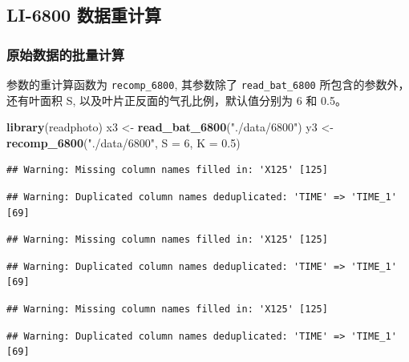 \documentclass[
]{krantz}
\makeatletter
\newenvironment{Shaded}{\begin{snugshade}}{\end{snugshade}}
\newcommand{\DataTypeTok}[1]{\textcolor[rgb]{0.13,0.29,0.53}{#1}}
\newcommand{\DecValTok}[1]{\textcolor[rgb]{0.00,0.00,0.81}{#1}}
\newcommand{\FloatTok}[1]{\textcolor[rgb]{0.00,0.00,0.81}{#1}}
\newcommand{\KeywordTok}[1]{\textcolor[rgb]{0.13,0.29,0.53}{\textbf{#1}}}
\newcommand{\NormalTok}[1]{#1}
\newcommand{\StringTok}[1]{\textcolor[rgb]{0.31,0.60,0.02}{#1}}
\newenvironment{kframe}{%
\medskip{}
\setlength{\fboxsep}{.8em}
 \def\at@end@of@kframe{}%
 \ifinner\ifhmode%
  \def\at@end@of@kframe{\end{minipage}}%
  \begin{minipage}{\columnwidth}%
 \fi\fi%
 \def\FrameCommand##1{\hskip\@totalleftmargin \hskip-\fboxsep
 \colorbox{shadecolor}{##1}\hskip-\fboxsep
     \hskip-\linewidth \hskip-\@totalleftmargin \hskip\columnwidth}%
 \MakeFramed {\advance\hsize-\width
   \@totalleftmargin\z@ \linewidth\hsize
   \@setminipage}}%
 {\par\unskip\endMakeFramed%
 \at@end@of@kframe}
\renewenvironment{Shaded}{\begin{kframe}}{\end{kframe}}
\makeatother
\begin{document}
\hypertarget{recompute6800}{%
\subsection{LI-6800 数据重计算}\label{recompute6800}}

\hypertarget{raw-batch-68}{%
\subsubsection{原始数据的批量计算}\label{raw-batch-68}}

参数的重计算函数为 \texttt{recomp\_6800}, 其参数除了 \texttt{read\_bat\_6800} 所包含的参数外，还有叶面积 S, 以及叶片正反面的气孔比例，默认值分别为 6 和 0.5。

\begin{Shaded}
\begin{Highlighting}[]
\KeywordTok{library}\NormalTok{(readphoto)}
\NormalTok{x3 <-}\StringTok{ }\KeywordTok{read_bat_6800}\NormalTok{(}\StringTok{"./data/6800"}\NormalTok{)}
\NormalTok{y3 <-}\StringTok{ }\KeywordTok{recomp_6800}\NormalTok{(}\StringTok{"./data/6800"}\NormalTok{, }\DataTypeTok{S =} \DecValTok{6}\NormalTok{, }\DataTypeTok{K =} \FloatTok{0.5}\NormalTok{)}
\end{Highlighting}
\end{Shaded}

\begin{verbatim}
## Warning: Missing column names filled in: 'X125' [125]
\end{verbatim}

\begin{verbatim}
## Warning: Duplicated column names deduplicated: 'TIME' => 'TIME_1' [69]
\end{verbatim}

\begin{verbatim}
## Warning: Missing column names filled in: 'X125' [125]
\end{verbatim}

\begin{verbatim}
## Warning: Duplicated column names deduplicated: 'TIME' => 'TIME_1' [69]
\end{verbatim}

\begin{verbatim}
## Warning: Missing column names filled in: 'X125' [125]
\end{verbatim}

\begin{verbatim}
## Warning: Duplicated column names deduplicated: 'TIME' => 'TIME_1' [69]
\end{verbatim}
\end{document}
